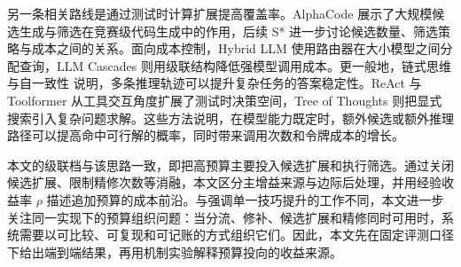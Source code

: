 另一条相关路线是通过测试时计算扩展提高覆盖率。AlphaCode\cite{li2022alphacode} 展示了大规模候选生成与筛选在竞赛级代码生成中的作用，后续 S*\cite{li2025sstar} 进一步讨论候选数量、筛选策略与成本之间的关系。面向成本控制，Hybrid LLM\cite{ding2024hybrid} 使用路由器在大小模型之间分配查询，LLM Cascades\cite{yue2024cascades} 则用级联结构降低强模型调用成本。更一般地，链式思维\cite{wei2022cot} 与自一致性\cite{wang2023selfconsistency} 说明，多条推理轨迹可以提升复杂任务的答案稳定性。ReAct\cite{yao2023react} 与 Toolformer\cite{schick2023toolformer} 从工具交互角度扩展了测试时决策空间，Tree of Thoughts\cite{yao2023tot} 则把显式搜索引入复杂问题求解。这些方法说明，在模型能力既定时，额外候选或额外推理路径可以提高命中可行解的概率，同时带来调用次数和令牌成本的增长。

本文的级联档与该思路一致，即把高预算主要投入候选扩展和执行筛选。通过关闭候选扩展、限制精修次数等消融，本文区分主增益来源与边际后处理，并用经验收益率 $\rho$ 描述追加预算的成本前沿。与强调单一技巧提升的工作不同，本文进一步关注同一实现下的预算组织问题：当分流、修补、候选扩展和精修同时可用时，系统需要以可比较、可复现和可记账的方式组织它们。因此，本文先在固定评测口径下给出端到端结果，再用机制实验解释预算投向的收益来源。
